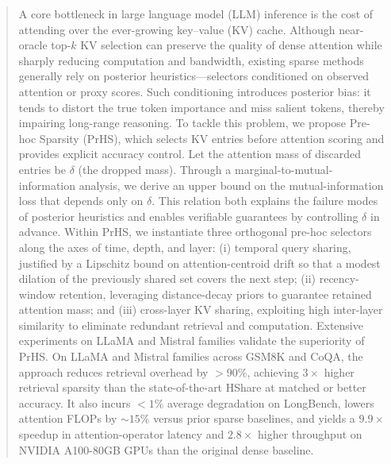 \begin{abstract}


A core bottleneck in large language model (LLM) inference is the cost of attending over the ever-growing key–value (KV) cache. Although near-oracle top-$k$ KV selection can preserve the quality of dense attention while sharply reducing computation and bandwidth, existing sparse methods generally rely on posterior heuristics—selectors conditioned on observed attention or proxy scores. Such conditioning introduces posterior bias: it tends to distort the true token importance and miss salient tokens, thereby impairing long-range reasoning.
To tackle this problem, we propose Pre-hoc Sparsity (PrHS), which selects KV entries before attention scoring and provides explicit accuracy control. Let the attention mass of discarded entries be $\delta$ (the dropped mass). Through a marginal-to-mutual-information analysis, we derive an upper bound on the mutual-information loss that depends only on $\delta$. This relation both explains the failure modes of posterior heuristics and enables verifiable guarantees by controlling $\delta$ in advance. Within PrHS, we instantiate three orthogonal pre-hoc selectors along the axes of time, depth, and layer: (i) temporal query sharing, justified by a Lipschitz bound on attention-centroid drift so that a modest dilation of the previously shared set covers the next step; (ii) recency-window retention, leveraging distance-decay priors to guarantee retained attention mass; and (iii) cross-layer KV sharing, exploiting high inter-layer similarity to eliminate redundant retrieval and computation. Extensive experiments on LLaMA and Mistral families validate the superiority of PrHS.  On LLaMA and Mistral families across GSM8K and CoQA, the approach reduces retrieval overhead by ${>}90\%$, achieving $3\times$ higher retrieval sparsity than the state-of-the-art HShare at matched or better accuracy. It also incurs ${<}1\%$ average degradation on LongBench, lowers attention FLOPs by ${\sim}15\%$ versus prior sparse baselines, and yields a $9.9\times$ speedup in attention-operator latency and $2.8\times$ higher throughput on NVIDIA A100-80GB GPUs than the original dense baseline.
\end{abstract}


